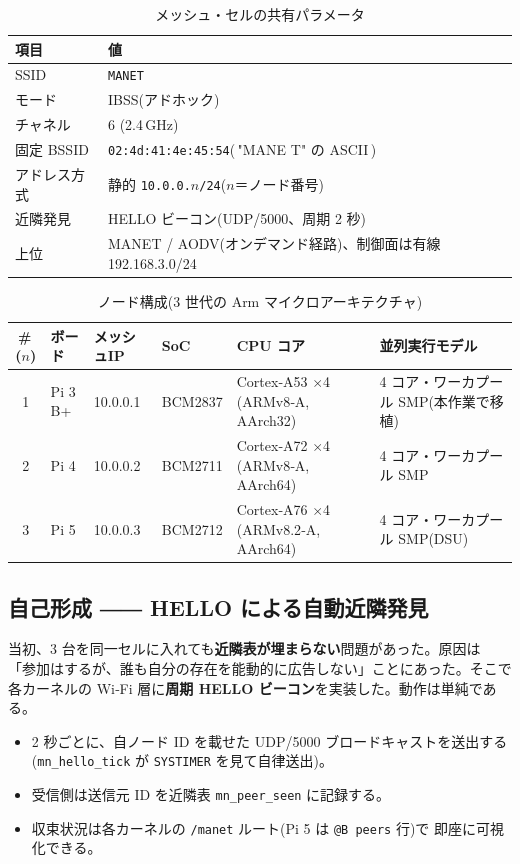 \documentclass[11pt,a4paper]{article}
\newcommand{\code}[1]{\texttt{#1}}
\begin{document}
\begin{table}[h]\centering
\caption{メッシュ・セルの共有パラメータ}\label{tab:cell}
\begin{tabular}{ll}
\toprule
項目 & 値 \\
\midrule
SSID            & \code{MANET} \\
モード          & IBSS(アドホック) \\
チャネル        & 6 (2.4\,GHz) \\
固定 BSSID      & \code{02:4d:41:4e:45:54}(\,"MANE T" の ASCII\,) \\
アドレス方式    & 静的 \code{10.0.0.$n$/24}($n$＝ノード番号) \\
近隣発見        & HELLO ビーコン(UDP/5000、周期 2 秒) \\
上位            & MANET / AODV(オンデマンド経路)、制御面は有線 192.168.3.0/24 \\
\bottomrule
\end{tabular}
\end{table}

\begin{table}[h]\centering
\caption{ノード構成(3 世代の Arm マイクロアーキテクチャ)}\label{tab:nodes}
\small
\begin{tabularx}{\linewidth}{cllllX}
\toprule
\#\,($n$) & ボード & メッシュIP & SoC & CPU コア & 並列実行モデル \\
\midrule
1 & Pi 3 B+ & 10.0.0.1 & BCM2837 & Cortex‑A53 $\times$4 (ARMv8‑A, AArch32) & 4 コア・ワーカプール SMP(本作業で移植) \\
2 & Pi 4    & 10.0.0.2 & BCM2711 & Cortex‑A72 $\times$4 (ARMv8‑A, AArch64) & 4 コア・ワーカプール SMP \\
3 & Pi 5    & 10.0.0.3 & BCM2712 & Cortex‑A76 $\times$4 (ARMv8.2‑A, AArch64) & 4 コア・ワーカプール SMP(DSU) \\
\bottomrule
\end{tabularx}
\end{table}

\subsection{自己形成 ―― HELLO による自動近隣発見}
当初、3 台を同一セルに入れても\textbf{近隣表が埋まらない}問題があった。原因は
「参加はするが、誰も自分の存在を能動的に広告しない」ことにあった。そこで各カーネルの
Wi‑Fi 層に\textbf{周期 HELLO ビーコン}を実装した。動作は単純である。

\begin{itemize}[leftmargin=1.4em,itemsep=1pt]
\item 2 秒ごとに、自ノード ID を載せた UDP/5000 ブロードキャストを送出する
      (\code{mn\_hello\_tick} が \code{SYSTIMER} を見て自律送出)。
\item 受信側は送信元 ID を近隣表 \code{mn\_peer\_seen} に記録する。
\item 収束状況は各カーネルの \code{/manet} ルート(Pi 5 は \code{@B peers} 行)で
      即座に可視化できる。
\end{itemize}
\end{document}
